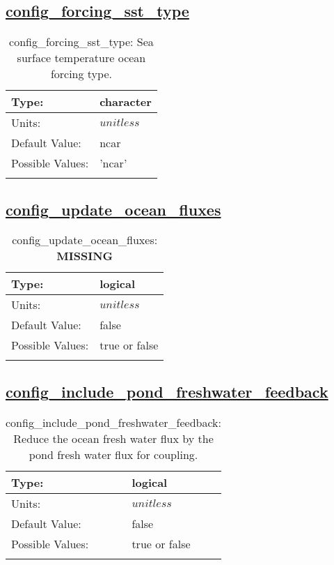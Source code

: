 \subsection[config\_forcing\_sst\_type]{\hyperref[sec:nm_tab_forcing]{config\_forcing\_sst\_type}}
\label{subsec:nm_sec_config_forcing_sst_type}
\begin{center}
\begin{longtable}{| p{2.0in} || p{4.0in} |}
    \hline
    Type: & character \\
    \hline
    Units: & $unitless$ \\
    \hline
    Default Value: & ncar \\
    \hline
    Possible Values: & 'ncar' \\
    \hline
    \caption{config\_forcing\_sst\_type: Sea surface temperature ocean forcing type.}
\end{longtable}
\end{center}
\subsection[config\_update\_ocean\_fluxes]{\hyperref[sec:nm_tab_forcing]{config\_update\_ocean\_fluxes}}
\label{subsec:nm_sec_config_update_ocean_fluxes}
\begin{center}
\begin{longtable}{| p{2.0in} || p{4.0in} |}
    \hline
    Type: & logical \\
    \hline
    Units: & $unitless$ \\
    \hline
    Default Value: & false \\
    \hline
    Possible Values: & true or false \\
    \hline
    \caption{config\_update\_ocean\_fluxes: {\bf \color{red} MISSING}}
\end{longtable}
\end{center}
\subsection[config\_include\_pond\_freshwater\_feedback]{\hyperref[sec:nm_tab_forcing]{config\_include\_pond\_freshwater\_feedback}}
\label{subsec:nm_sec_config_include_pond_freshwater_feedback}
\begin{center}
\begin{longtable}{| p{2.0in} || p{4.0in} |}
    \hline
    Type: & logical \\
    \hline
    Units: & $unitless$ \\
    \hline
    Default Value: & false \\
    \hline
    Possible Values: & true or false \\
    \hline
    \caption{config\_include\_pond\_freshwater\_feedback: Reduce the ocean fresh water flux by the pond fresh water flux for coupling.}
\end{longtable}
\end{center}
